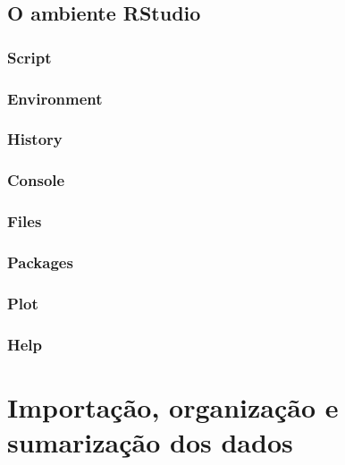 \documentclass[]{book}
\begin{document}
\hypertarget{o-ambiente-rstudio}{%
\section{O ambiente RStudio}\label{o-ambiente-rstudio}}

\hypertarget{script}{%
\subsection{Script}\label{script}}

\hypertarget{environment}{%
\subsection{Environment}\label{environment}}

\hypertarget{history}{%
\subsection{History}\label{history}}

\hypertarget{console}{%
\subsection{Console}\label{console}}

\hypertarget{files}{%
\subsection{Files}\label{files}}

\hypertarget{packages}{%
\subsection{Packages}\label{packages}}

\hypertarget{plot}{%
\subsection{Plot}\label{plot}}

\hypertarget{help}{%
\subsection{Help}\label{help}}

\hypertarget{importauxe7uxe3o-organizauxe7uxe3o-e-sumarizauxe7uxe3o-dos-dados}{%
\chapter{Importação, organização e sumarização dos dados}\label{importauxe7uxe3o-organizauxe7uxe3o-e-sumarizauxe7uxe3o-dos-dados}}
\end{document}
